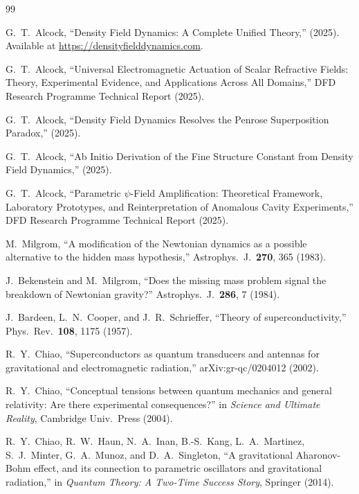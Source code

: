 \documentclass[twocolumn,prl,superscriptaddress,nofootinbib,longbibliography,floatfix]{revtex4-2}
\begin{document}

\begin{thebibliography}{99}

G.~T.~Alcock,
``Density Field Dynamics: A Complete Unified Theory,''
(2025).
Available at \url{https://densityfielddynamics.com}.

G.~T.~Alcock,
``Universal Electromagnetic Actuation of Scalar Refractive Fields:
Theory, Experimental Evidence, and Applications Across All Domains,''
DFD Research Programme Technical Report (2025).

G.~T.~Alcock,
``Density Field Dynamics Resolves the Penrose Superposition Paradox,''
(2025).

G.~T.~Alcock,
``Ab Initio Derivation of the Fine Structure Constant from Density
Field Dynamics,'' (2025).

G.~T.~Alcock,
``Parametric $\psi$-Field Amplification: Theoretical Framework,
Laboratory Prototypes, and Reinterpretation of Anomalous Cavity
Experiments,'' DFD Research Programme Technical Report (2025).

M.~Milgrom,
``A modification of the Newtonian dynamics as a possible alternative
to the hidden mass hypothesis,''
Astrophys.\ J.\ \textbf{270}, 365 (1983).

J.~Bekenstein and M.~Milgrom,
``Does the missing mass problem signal the breakdown of Newtonian
gravity?''
Astrophys.\ J.\ \textbf{286}, 7 (1984).

J.~Bardeen, L.~N.~Cooper, and J.~R.~Schrieffer,
``Theory of superconductivity,''
Phys.\ Rev.\ \textbf{108}, 1175 (1957).

R.~Y.~Chiao,
``Superconductors as quantum transducers and antennas for gravitational
and electromagnetic radiation,''
arXiv:gr-qc/0204012 (2002).

R.~Y.~Chiao,
``Conceptual tensions between quantum mechanics and general relativity:
Are there experimental consequences?''
in \emph{Science and Ultimate Reality}, Cambridge Univ.\ Press (2004).

R.~Y.~Chiao, R.~W.~Haun, N.~A.~Inan, B.-S.~Kang, L.~A.~Martinez,
S.~J.~Minter, G.~A.~Munoz, and D.~A.~Singleton,
``A gravitational Aharonov-Bohm effect, and its connection to
parametric oscillators and gravitational radiation,''
in \emph{Quantum Theory: A Two-Time Success Story}, Springer (2014).


\end{thebibliography}
\end{document}
